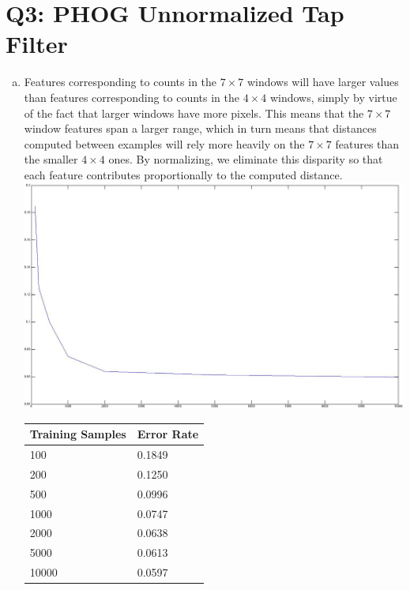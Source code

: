 \documentclass[12pt]{article}
\begin{document}
\section*{Q3: PHOG Unnormalized Tap Filter}
  \begin{enumerate}[c.]
    \item Features corresponding to counts in the $7 \times 7$ windows will have
      larger values than features corresponding to counts in the $4 \times 4$
      windows, simply by virtue of the fact that larger windows have more
      pixels. This means that the $7 \times 7$ window features span a larger
      range, which in turn means that distances computed between examples will
      rely more heavily on the $7 \times 7$ features than the smaller $4 \times
      4$ ones. By normalizing, we eliminate this disparity so that each feature
      contributes proportionally to the computed distance. \\
      \includegraphics[scale=0.35]{q3_unnormalized.jpg}
      \begin{tabular}{l|l}
        \hline
        Training Samples & Error Rate \\
        \hline
        100   & 0.1849 \\
        200   & 0.1250 \\
        500   & 0.0996 \\
        1000  & 0.0747 \\
        2000  & 0.0638 \\
        5000  & 0.0613 \\
        10000 & 0.0597 \\
      \end{tabular}
  \end{enumerate}

\newpage
\end{document}
